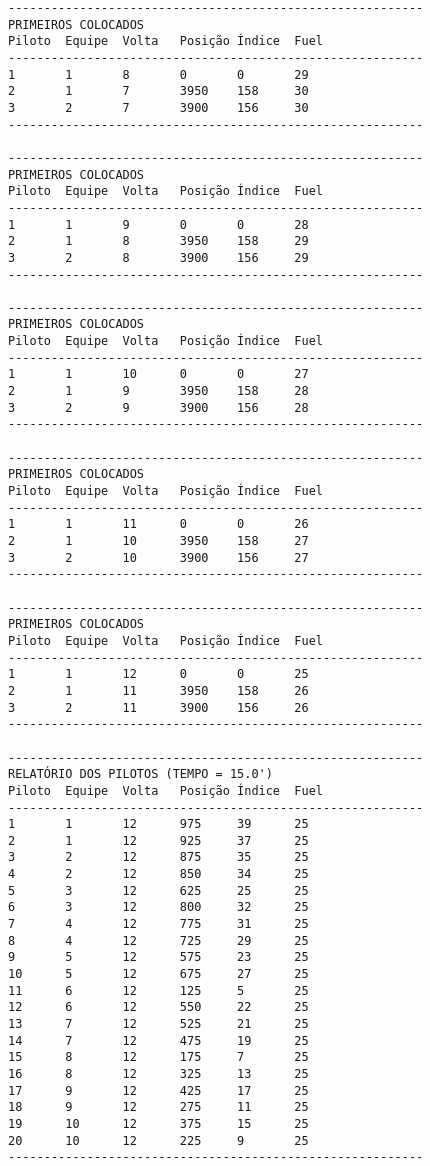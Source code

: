 \documentclass[12pt]{article}
\begin{document}
\begin{verbatim}
----------------------------------------------------------
PRIMEIROS COLOCADOS
Piloto  Equipe  Volta   Posição Índice  Fuel
----------------------------------------------------------
1       1       8       0       0       29
2       1       7       3950    158     30
3       2       7       3900    156     30
----------------------------------------------------------

----------------------------------------------------------
PRIMEIROS COLOCADOS
Piloto  Equipe  Volta   Posição Índice  Fuel
----------------------------------------------------------
1       1       9       0       0       28
2       1       8       3950    158     29
3       2       8       3900    156     29
----------------------------------------------------------

----------------------------------------------------------
PRIMEIROS COLOCADOS
Piloto  Equipe  Volta   Posição Índice  Fuel
----------------------------------------------------------
1       1       10      0       0       27
2       1       9       3950    158     28
3       2       9       3900    156     28
----------------------------------------------------------

----------------------------------------------------------
PRIMEIROS COLOCADOS
Piloto  Equipe  Volta   Posição Índice  Fuel
----------------------------------------------------------
1       1       11      0       0       26
2       1       10      3950    158     27
3       2       10      3900    156     27
----------------------------------------------------------

----------------------------------------------------------
PRIMEIROS COLOCADOS
Piloto  Equipe  Volta   Posição Índice  Fuel
----------------------------------------------------------
1       1       12      0       0       25
2       1       11      3950    158     26
3       2       11      3900    156     26
----------------------------------------------------------

----------------------------------------------------------
RELATÓRIO DOS PILOTOS (TEMPO = 15.0')
Piloto  Equipe  Volta   Posição Índice  Fuel
----------------------------------------------------------
1       1       12      975     39      25
2       1       12      925     37      25
3       2       12      875     35      25
4       2       12      850     34      25
5       3       12      625     25      25
6       3       12      800     32      25
7       4       12      775     31      25
8       4       12      725     29      25
9       5       12      575     23      25
10      5       12      675     27      25
11      6       12      125     5       25
12      6       12      550     22      25
13      7       12      525     21      25
14      7       12      475     19      25
15      8       12      175     7       25
16      8       12      325     13      25
17      9       12      425     17      25
18      9       12      275     11      25
19      10      12      375     15      25
20      10      12      225     9       25
----------------------------------------------------------


\end{verbatim}
\end{document}
